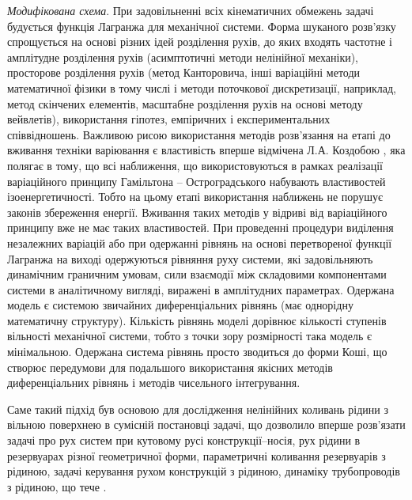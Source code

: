 \documentclass[11pt, reqno]{amsart}
\begin{document}
{\it Модифікована схема}. При задовільненні всіх кінематичних обмежень задачі будується функція Лагранжа для механічної системи. Форма шуканого розв’язку спрощується на основі різних ідей розділення рухів, до яких входять частотне і амплітудне розділення рухів (асимптотичні методи нелінійної механіки), просторове розділення рухів (метод Канторовича, інші  варіаційні методи математичної фізики в тому числі і методи поточкової дискретизації, наприклад, метод скінчених елементів, масштабне розділення рухів на основі методу вейвлетів), використання гіпотез, емпіричних і експериментальних співвідношень. Важливою рисою використання методів розв'язання на етапі до вживання техніки варіювання є властивість вперше відмічена Л.А. Коздобою \cite{Koz}, яка полягає в тому, що всі наближення, що використовуються в рамках реалізації варіаційного принципу Гамільтона -- Остроградського набувають властивостей ізоенергетичності. Тобто на цьому етапі використання наближень не порушує законів збереження енергії. Вживання таких методів у відриві від варіаційного принципу вже не має таких властивостей. При проведенні процедури виділення незалежних варіацій або при одержанні рівнянь на основі перетвореної функції Лагранжа на виході одержуються рівняння руху системи, які задовільняють динамічним граничним умовам, сили взаємодії між складовими компонентами системи в аналітичному вигляді, виражені в амплітудних параметрах. Одержана модель є системою звичайних диференціальних рівнянь (має однорідну математичну структуру). Кількість рівнянь моделі дорівнює кількості ступенів вільності механічної системи, тобто з точки зору розмірності така модель є мінімальною. Одержана система рівнянь просто зводиться до форми Коші, що створює передумови для подальшого використання якісних методів диференціальних рівнянь і методів чисельного інтегрування.

Саме такий підхід був основою для дослідження нелінійних коливань рідини з вільною поверхнею в сумісній постановці задачі, що дозволило вперше розв'язати задачі про рух систем при кутовому русі конструкції--носія, рух рідини в резервуарах різної геометричної форми, параметричні коливання резервуарів з рідиною, задачі керування рухом конструкцій з рідиною, динаміку трубопроводів з рідиною, що тече \cite{Limbo,Kon,Lkib,LS}.
\end{document}
